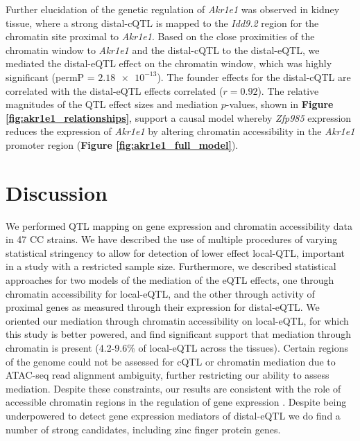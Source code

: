 \documentclass[9pt,twocolumn,twoside]{gsajnl}
\newcommand{\WV}[2]{\textcolor{red}{#1\footnote{\textcolor{red}{WV: #2}}}}
\begin{document}
Further elucidation of the genetic regulation of \textit{Akr1e1} was observed in kidney tissue, where a strong distal-cQTL is mapped to the \textit{Idd9.2} region for the chromatin site proximal to \textit{Akr1e1}. Based on the close proximities of the chromatin window to \textit{Akr1e1} and the distal-cQTL to the distal-eQTL, we mediated the distal-eQTL effect on the chromatin window, which was highly significant (permP = $\num{2.18e-13}$). The founder effects for the distal-cQTL are correlated with the distal-eQTL effects correlated ($r = 0.92$). The relative magnitudes of the QTL effect sizes and mediation $p$-values, shown in \textbf{Figure \ref{fig:akr1e1_relationships}}, support a causal model whereby \textit{Zfp985} expression reduces the expression of \textit{Akr1e1} by altering chromatin accessibility in the \textit{Akr1e1} promoter region (\textbf{Figure \ref{fig:akr1e1_full_model}}). 

\section{Discussion}

We performed QTL mapping on gene expression and chromatin accessibility data in 47 CC strains. We have described the use of multiple procedures of varying statistical stringency to allow for detection of lower effect local-QTL, important in a study with a restricted sample size. 
Furthermore, we described statistical approaches for two models of the mediation of the eQTL effects, one through chromatin accessibility for local-eQTL, and the other through activity of proximal genes as measured through their expression for distal-eQTL. We oriented our mediation through chromatin accessibility on local-eQTL, for which this study is better powered, and find significant support that mediation through chromatin is present (4.2-9.6\% of local-eQTL across the tissues). Certain regions of the genome could not be assessed for cQTL or chromatin mediation due to ATAC-seq read alignment ambiguity, further restricting our ability to assess mediation. Despite these constraints, our results are consistent with the role of accessible chromatin regions in the regulation of gene expression \citep{Klemm2019}. Despite being underpowered to detect gene expression mediators of distal-eQTL we do find a number of strong candidates, including zinc finger protein genes.
\end{document}
